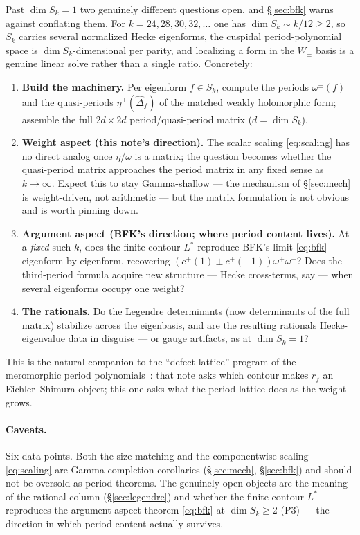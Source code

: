 \documentclass[11pt]{article}
\newcommand{\Dhat}{\widehat\Delta}
\begin{document}
Past $\dim S_k=1$ two genuinely different questions open, and \S\ref{sec:bfk} warns
against conflating them. For $k=24,28,30,32,\dots$ one has $\dim S_k\sim k/12\ge2$, so
$S_k$ carries several normalized Hecke eigenforms, the cuspidal period-polynomial space is
$\dim S_k$-dimensional per parity, and localizing a form in the $W_\pm$ basis is a genuine
linear solve rather than a single ratio. Concretely:
\begin{enumerate}
\item[(P1)] \textbf{Build the machinery.} Per eigenform $f\in S_k$, compute the periods
$\omega^\pm(f)$ and the quasi-periods $\eta^\pm(\Dhat_{f})$ of the matched weakly
holomorphic form; assemble the full $2d\times2d$ period/quasi-period matrix
($d=\dim S_k$).
\item[(P2)] \textbf{Weight aspect (this note's direction).} The scalar scaling
\eqref{eq:scaling} has no direct analog once $\eta/\omega$ is a matrix; the question becomes
whether the quasi-period matrix approaches the period matrix in any fixed sense as
$k\to\infty$. Expect this to stay Gamma-shallow --- the mechanism of \S\ref{sec:mech} is
weight-driven, not arithmetic --- but the matrix formulation is not obvious and is worth
pinning down.
\item[(P3)] \textbf{Argument aspect (BFK's direction; where period content lives).} At a
\emph{fixed} such $k$, does the finite-contour $L^*$ reproduce BFK's limit \eqref{eq:bfk}
eigenform-by-eigenform, recovering $(c^+(1)\pm c^+(-1))\omega^+\omega^-$? Does the
third-period formula acquire new structure --- Hecke cross-terms, say --- when several
eigenforms occupy one weight?
\item[(P4)] \textbf{The rationals.} Do the Legendre determinants (now determinants of the
full matrix) stabilize across the eigenbasis, and are the resulting rationals
Hecke-eigenvalue data in disguise --- or gauge artifacts, as at $\dim S_k=1$?
\end{enumerate}
This is the natural companion to the ``defect lattice'' program of the meromorphic
period polynomials~\cite{DefectNote}: that note asks which contour makes $r_f$ an
Eichler--Shimura object; this one asks what the period lattice does as the weight grows.

\paragraph{Caveats.} Six data points. Both the size-matching and the componentwise scaling
\eqref{eq:scaling} are Gamma-completion corollaries (\S\ref{sec:mech}, \S\ref{sec:bfk}) and
should not be oversold as period theorems. The genuinely open objects are the meaning of
the rational column (\S\ref{sec:legendre}) and whether the finite-contour $L^*$ reproduces
the argument-aspect theorem \eqref{eq:bfk} at $\dim S_k\ge2$ (P3) --- the direction in which
period content actually survives.
\end{document}
